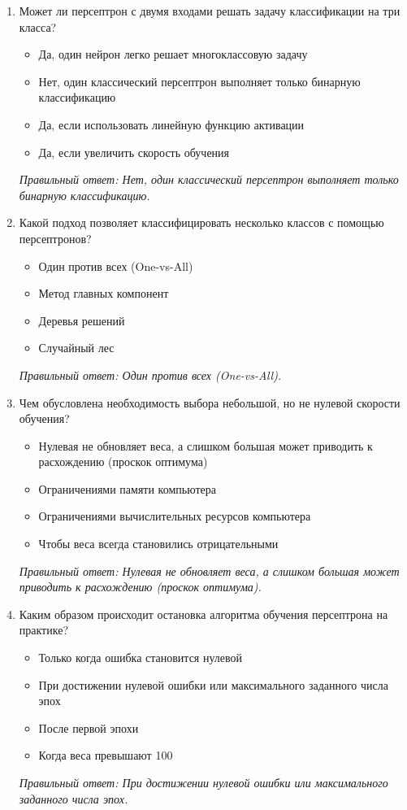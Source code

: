 \begin{enumerate}[label=\textbf{\arabic*.}, leftmargin=0pt, itemsep=1.2em]
\item Может ли персептрон с двумя входами решать задачу классификации на три класса?
\begin{itemize}[label=$\square$, leftmargin=1.5cm, itemsep=0.2em, topsep=0.3em]
\item Да, один нейрон легко решает многоклассовую задачу
\item Нет, один классический персептрон выполняет только бинарную классификацию
\item Да, если использовать линейную функцию активации
\item Да, если увеличить скорость обучения
\end{itemize}
{\small\textit{Правильный ответ: Нет, один классический персептрон выполняет только бинарную классификацию.}}

\item Какой подход позволяет классифицировать несколько классов с помощью персептронов?
\begin{itemize}[label=$\square$, leftmargin=1.5cm, itemsep=0.2em, topsep=0.3em]
\item Один против всех (One-vs-All)
\item Метод главных компонент
\item Деревья решений
\item Случайный лес
\end{itemize}
{\small\textit{Правильный ответ: Один против всех (One-vs-All).}}

\item Чем обусловлена необходимость выбора небольшой, но не нулевой скорости обучения?
\begin{itemize}[label=$\square$, leftmargin=1.5cm, itemsep=0.2em, topsep=0.3em]
\item Нулевая не обновляет веса, а слишком большая может приводить к расхождению (проскок оптимума)
\item Ограничениями памяти компьютера
\item Ограничениями вычислительных ресурсов компьютера
\item Чтобы веса всегда становились отрицательными
\end{itemize}
{\small\textit{Правильный ответ: Нулевая не обновляет веса, а слишком большая может приводить к расхождению (проскок оптимума).}}

\item Каким образом происходит остановка алгоритма обучения персептрона на практике?
\begin{itemize}[label=$\square$, leftmargin=1.5cm, itemsep=0.2em, topsep=0.3em]
\item Только когда ошибка становится нулевой
\item При достижении нулевой ошибки или максимального заданного числа эпох
\item После первой эпохи
\item Когда веса превышают 100
\end{itemize}
{\small\textit{Правильный ответ: При достижении нулевой ошибки или максимального заданного числа эпох.}}


\end{enumerate}
